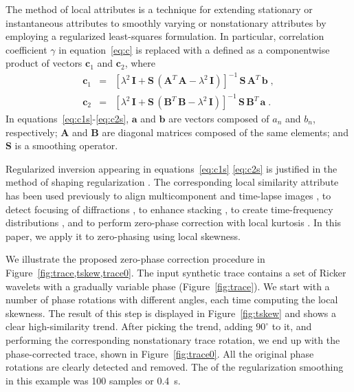 The method of local attributes \cite[]{attr} is a technique for
extending stationary or instantaneous attributes to smoothly varying
or nonstationary attributes by employing a regularized least-squares
formulation. In particular,  
correlation coefficient $\gamma$ in equation~\ref{eq:c} is replaced
with a   defined
as a componentwise product of vectors $\mathbf{c}_1$ and
$\mathbf{c}_2$, where
\begin{eqnarray}
  \label{eq:c1s}
  \mathbf{c}_1 & = & 
  \left[\lambda^2\,\mathbf{I} + 
    \mathbf{S}\,\left(\mathbf{A}^T\,\mathbf{A} - \lambda^2\,\mathbf{I}\right)\right]^{-1}\,
  \mathbf{S}\,\mathbf{A}^T\,\mathbf{b}\;, \\
  \label{eq:c2s}
  \mathbf{c}_2 & = & 
    \left[\lambda^2\,\mathbf{I} + 
      \mathbf{S}\,\left(\mathbf{B}^T\,\mathbf{B} - \lambda^2\,\mathbf{I}\right)\right]^{-1}\,
    \mathbf{S}\,\mathbf{B}^T\,\mathbf{a}\;.
\end{eqnarray}
In equations~\ref{eq:c1s}-\ref{eq:c2s}, $\mathbf{a}$ and $\mathbf{b}$
are vectors composed of $a_n$ and $b_n$, respectively; $\mathbf{A}$
and $\mathbf{B}$ are diagonal matrices composed of the same elements;
and $\mathbf{S}$ is a smoothing operator. 

Regularized inversion
appearing in equations~\ref{eq:c1s}  \ref{eq:c2s} is justified in the
method of shaping regularization \cite[]{shape}. The corresponding
local similarity attribute has been used previously to align
multicomponent and time-lapse images \cite[]{attr,timelapse,hesam,rui}, to
detect focusing of diffractions \cite[]{diffr}, to enhance
stacking \cite[]{illum,stack}, to create time-frequency
distributions \cite[]{timefreq}, and to perform zero-phase correction
with local kurtosis \cite[]{mirko2}. In this paper, we apply it to
zero-phasing  using local skewness.


We illustrate the proposed zero-phase correction procedure in
Figure~\ref{fig:trace,tskew,trace0}. The input synthetic trace
contains a set of Ricker wavelets with a gradually variable phase
(Figure~\ref{fig:trace}). We start with a number of phase rotations
with different angles, each time computing the local skewness. The
result of this step is displayed in Figure~\ref{fig:tskew} and shows a
clear high-similarity trend. After picking the trend, adding
$90^{\circ}$ to it, and performing the corresponding nonstationary
trace rotation, we end up with the phase-corrected trace, shown in
Figure~\ref{fig:trace0}. All the original phase rotations are clearly
detected and removed. The   of the
regularization smoothing in this example was 100 samples or 0.4~s.

